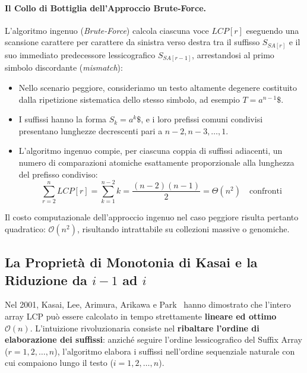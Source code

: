 \paragraph{Il Collo di Bottiglia dell'Approccio Brute-Force.}
L'algoritmo ingenuo (\textit{Brute-Force}) calcola ciascuna voce $LCP[r]$ eseguendo una scansione carattere per carattere da sinistra verso destra tra il suffisso $S_{SA[r]}$ e il suo immediato predecessore lessicografico $S_{SA[r-1]}$, arrestandosi al primo simbolo discordante (\textit{mismatch}):
\begin{itemize}
  \item Nello scenario peggiore, consideriamo un testo altamente degenere costituito dalla ripetizione sistematica dello stesso simbolo, ad esempio $T = a^{n-1}\$$.
  \item I suffissi hanno la forma $S_k = a^k\$$, e i loro prefissi comuni condivisi presentano lunghezze decrescenti pari a $n-2, n-3, \dots, 1$.
  \item L'algoritmo ingenuo compie, per ciascuna coppia di suffissi adiacenti, un numero di comparazioni atomiche esattamente proporzionale alla lunghezza del prefisso condiviso:
  \begin{equation}
    \sum_{r=2}^n LCP[r] = \sum_{k=1}^{n-2} k = \frac{(n-2)(n-1)}{2} = \Theta(n^2) \quad \text{confronti}
  \end{equation}
\end{itemize}
Il costo computazionale dell'approccio ingenuo nel caso peggiore risulta pertanto quadratico: $\mathcal{O}(n^2)$, risultando intrattabile su collezioni massive o genomiche.

\FloatBarrier
\subsection{La Proprietà di Monotonia di Kasai e la Riduzione da \texorpdfstring{$i-1$}{i-1} ad \texorpdfstring{$i$}{i}}
\label{subsec:monotonia-kasai-riduzione}

Nel 2001, Kasai, Lee, Arimura, Arikawa e Park~\cite{kasai2001} hanno dimostrato che l'intero array LCP pu\`o essere calcolato in tempo strettamente \textbf{lineare ed ottimo $\mathcal{O}(n)$}. L'intuizione rivoluzionaria consiste nel \textbf{ribaltare l'ordine di elaborazione dei suffissi}: anzich\'e seguire l'ordine lessicografico del Suffix Array ($r = 1, 2, \dots, n$), l'algoritmo elabora i suffissi nell'ordine sequenziale naturale con cui compaiono lungo il testo ($i = 1, 2, \dots, n$).

